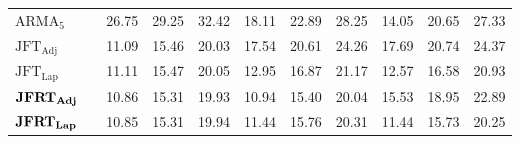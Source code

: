 \documentclass[a4paper, 12pt]{article}
\begin{document}
\begin{table}[ht]
{\begin{tabular}{@{}llrrrrrrrrr@{}}
			\(\text{ARMA}_5\)                              &                                       & 26.75                         & 29.25                         & 32.42                          & 18.11     & 22.89     & 28.25     & 14.05     & 20.65     & 27.33     \\
			\(\text{JFT}_{\text{Adj}}\)                    &                                       & 11.09                         & 15.46                         & 20.03                          & 17.54     & 20.61     & 24.26     & 17.69     & 20.74     & 24.37     \\
			\(\text{JFT}_{\text{Lap}}\)                    &                                       & 11.11                         & 15.47                         & 20.05                          & 12.95     & 16.87     & 21.17     & 12.57     & 16.58     & 20.93     \\
			\(\text{\textbf{JFRT}}_{\text{\textbf{Adj}}}\) &                                       & 10.86                         & 15.31                         & 19.93                          & 10.94     & 15.40     & 20.04     & 15.53     & 18.95     & 22.89     \\
			\(\text{\textbf{JFRT}}_{\text{\textbf{Lap}}}\) &                                       & 10.85                         & 15.31                         & 19.94                          & 11.44     & 15.76     & 20.31     & 11.44     & 15.73     & 20.25     \\
			\bottomrule
		\end{tabular}
	}
\end{table}
\end{document}
